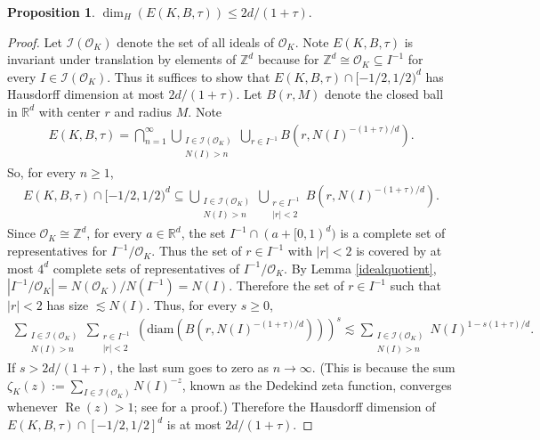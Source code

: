\documentclass{amsart}
\numberwithin{equation}{section}
\theoremstyle{definition}
\newtheorem{prop}[theorem]{Proposition}
\theoremstyle{definition}
\def\RR{\mathbb{R}}
\def\ZZ{\mathbb{Z}}
\newcommand{\rbr}[1]{\left( {#1} \right)}
\renewcommand{\Re}{\operatorname{Re}}
\newcommand{\OK}{\mathcal{O}_K}
\newcommand{\isom}{\cong}
\begin{document}
\begin{prop}\label{hausdorff upper bound}
$\dim_H(E(K,B,\tau)) \leq 2d/(1+\tau)$.  
\end{prop}
%
\begin{proof}
Let $\mathcal{I}(\OK)$ denote the set of all ideals of $\OK$. 
Note $E(K,B,\tau)$ is invariant under translation by elements of $\ZZ^d$ because for $\ZZ^d \isom \OK \subseteq I^{-1}$ for every $I \in \mathcal{I}(\OK)$. 
Thus it suffices to show that $E(K,B,\tau) \cap [-1/2,1/2)^d$ has Hausdorff dimension at most $2d/(1+\tau)$. 
Let $B(r,M)$ denote the closed ball in $\RR^d$ with center $r$ and radius $M$. 
Note 
\begin{align*}
E(K,B,\tau) 
 = \bigcap_{n=1}^{\infty} \bigcup_{\substack{ I \in \mathcal{I}(\OK) \\ N(I) > n}}  \bigcup_{r \in I^{-1}} 
 B( r,N(I)^{-(1+\tau)/d} ). 
\end{align*}
So, for every $n \geq 1$,  
\begin{align*}
E(K,B,\tau) \cap [-1/2,1/2)^d 
\subseteq \bigcup_{\substack{ I \in \mathcal{I}(\OK) \\ N(I) > n}} 
\bigcup_{\substack{r \in I^{-1} \\ |r| < 2}} 
 B( r,N(I)^{-(1+\tau)/d} ). 
\end{align*}
Since $\OK \isom \ZZ^d$, for every $a \in \RR^d$, 
the set $I^{-1} \cap (a+[0,1)^d)$ is a complete set of representatives for $I^{-1}/\OK$. Thus the set of $r \in I^{-1}$ with $|r|<2$ is covered by at most $4^d$ complete sets of representatives of $I^{-1}/\OK$. By Lemma \ref{idealquotient}, 
$|I^{-1} / \OK| 
= {N(\OK)}/{N(I^{-1})} 
= N(I)$.  
Therefore the set of $r \in I^{-1}$ such that $|r| < 2$ has size $\lesssim N(I)$. Thus, for every $s \geq 0$, 
\begin{align*}
\sum_{\substack{ I \in \mathcal{I}(\OK) \\ N(I) > n}} 
\sum_{\substack{r \in I^{-1}\\ |r| < 2}} 
	\rbr{ \text{diam}( B( r,N(I)^{-(1+\tau)/d} ) ) }^s
\lesssim   
\sum_{\substack{ I \in \mathcal{I}(\OK) \\ N(I) > n}} N(I)^{1-s(1+\tau)/d}. 
\end{align*}
If $s > 2d/(1+\tau)$, the last sum goes to zero as $n \to \infty$. (This is because the sum $\zeta_{K}(z) := \sum_{ I \in \mathcal{I}(\OK) } N(I)^{-z}$, known as the Dedekind zeta function, converges whenever $\Re(z)>1$; see \cite[Ch.10]{Jarvis14} for a proof.)
Therefore the Hausdorff dimension of $E(K,B,\tau) \cap [-1/2,1/2]^d$ is at most $2d/(1+\tau)$. 
\end{proof}
\end{document}
